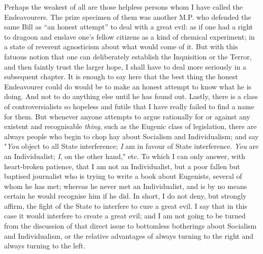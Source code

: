 \documentclass{book}
\begin{document}
Perhaps the weakest of all are those helpless persons whom I have called the Endeavourers. The prize specimen of them was another M.P. who defended the same Bill as “an honest attempt” to deal with a great evil: as if one had a right to dragoon and enslave one’s fellow citizens as a kind of chemical experiment; in a state of reverent agnosticism about what would come of it. But with this fatuous notion that one can deliberately establish the Inquisition or the Terror, and then faintly trust the larger hope, I shall have to deal more seriously in a subsequent chapter. It is enough to say here that the best thing the honest Endeavourer could do would be to make an honest attempt to know what he is doing. And not to do anything else until he has found out. Lastly, there is a class of controversialists so hopeless and futile that I have really failed to find a name for them. But whenever anyone attempts to argue rationally for or against any existent and recognisable \emph{thing}, such as the Eugenic class of legislation, there are always people who begin to chop hay about Socialism and Individualism; and say "\emph{You} object to all State interference; \emph{I} am in favour of State interference. \emph{You} are an Individualist; \emph{I}, on the other hand," etc. To which I can only answer, with heart-broken patience, that I am not an Individualist, but a poor fallen but baptised journalist who is trying to write a book about Eugenists, several of whom he has met; whereas he never met an Individualist, and is by no means certain he would recognise him if he did. In short, I do not deny, but strongly affirm, the fight of the State to interfere to cure a great evil. I say that in this case it would interfere to create a great evil; and I am not going to be turned from the discussion of that direct issue to bottomless botherings about Socialism and Individualism, or the relative advantages of always turning to the right and always turning to the left.
\end{document}
